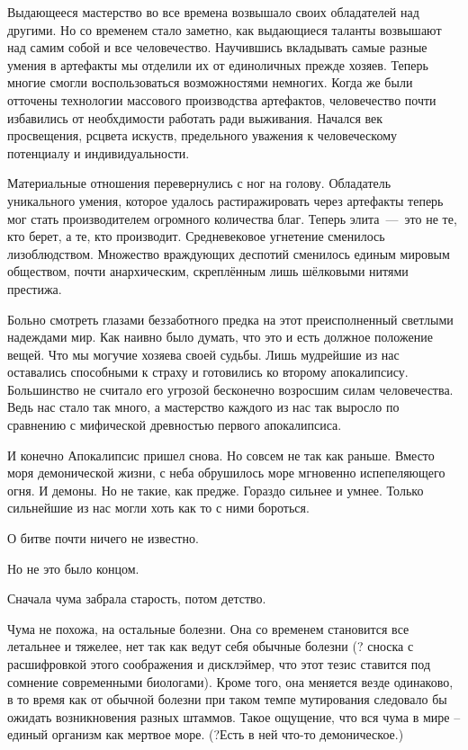 \documentclass[12pt,a4paper]{article}
\begin{document}
Выдающееся мастерство во все времена возвышало своих обладателей над другими. Но со временем стало заметно, как выдающиеся таланты возвышают над самим собой и все человечество. 
Научившись вкладывать самые разные умения в артефакты мы отделили их от единоличных прежде хозяев. Теперь многие смогли воспользоваться возможностями немногих. Когда же были отточены технологии массового производства артефактов, человечество почти избавились от необхдимости работать ради выживания. Начался век просвещения, рсцвета искуств, предельного уважения к человеческому потенциалу и индивидуальности. 

Материальные отношения перевернулись с ног на голову. Обладатель уникального умения, которое удалось растиражировать через артефакты теперь мог стать производителем огромного количества благ. Теперь элита~---~это не те, кто берет, а те, кто производит. Средневековое угнетение сменилось лизоблюдством. Множество враждующих деспотий сменилось единым мировым обществом, почти анархическим, скреплённым лишь шёлковыми нитями престижа.

Больно смотреть глазами беззаботного предка на этот преисполненный светлыми надеждами мир. Как наивно было думать, что это и есть должное положение вещей. Что мы могучие хозяева своей судьбы. Лишь мудрейшие из нас оставались способными к страху и готовились ко второму апокалипсису. Большинство не считало его угрозой бесконечно возросшим силам человечества. Ведь нас стало так много, а мастерство каждого из нас так выросло по сравнению с мифической древностью первого апокалипсиса.

И конечно Апокалипсис пришел снова. Но совсем не так как раньше. Вместо моря демонической жизни, с неба обрушилось море мгновенно испепеляющего огня. И демоны. Но не такие, как предже. Гораздо сильнее и умнее. Только сильнейшие из нас могли хоть как то с ними бороться.


О битве почти ничего не известно. 

Но не это было концом.

Сначала чума забрала старость, потом детство.

Чума не похожа, на остальные болезни. Она со временем становится все летальнее и тяжелее, нет так как ведут себя обычные болезни (? сноска с расшифровкой этого соображения и дисклэймер, что этот тезис ставится под сомнение современными биологами). Кроме того, она меняется везде одинаково, в то время как от обычной болезни при таком темпе мутирования следовало бы ожидать возникновения разных штаммов. Такое ощущение, что вся чума в мире -- единый организм как мертвое море. (?Есть в ней что-то демоническое.)
\end{document}
